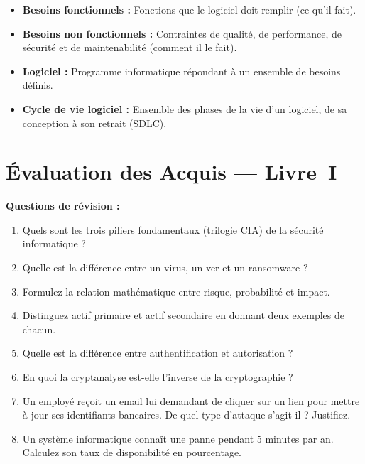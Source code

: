 \begin{itemize}
    \item \textbf{Besoins fonctionnels :} Fonctions que le logiciel doit remplir (ce qu'il fait).
    \item \textbf{Besoins non fonctionnels :} Contraintes de qualité, de performance, de sécurité et de maintenabilité (comment il le fait).
    \item \textbf{Logiciel :} Programme informatique répondant à un ensemble de besoins définis.
    \item \textbf{Cycle de vie logiciel :} Ensemble des phases de la vie d'un logiciel, de sa conception à son retrait (SDLC).
\end{itemize}

\section{Évaluation des Acquis --- Livre~I}

\begin{boxexo}
\textbf{Questions de révision :}
\begin{enumerate}
    \item Quels sont les trois piliers fondamentaux (trilogie CIA) de la sécurité informatique ?
    \item Quelle est la différence entre un virus, un ver et un ransomware ?
    \item Formulez la relation mathématique entre risque, probabilité et impact.
    \item Distinguez actif primaire et actif secondaire en donnant deux exemples de chacun.
    \item Quelle est la différence entre authentification et autorisation ?
    \item En quoi la cryptanalyse est-elle l'inverse de la cryptographie ?
    \item Un employé reçoit un email lui demandant de cliquer sur un lien pour mettre à jour ses identifiants bancaires. De quel type d'attaque s'agit-il ? Justifiez.
    \item Un système informatique connaît une panne pendant 5 minutes par an. Calculez son taux de disponibilité en pourcentage.
\end{enumerate}
\end{boxexo}
